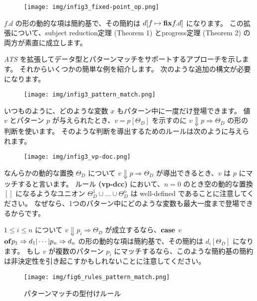 \documentclass[submit,techreq,noauthor,onecolumn]{ipsj}
\begin{document}
\begin{figure}[h]
\centering
\texttt{[image: img/infig3\_fixed-point\_op.png]}
\end{figure}

 $f.d$ の形の動的な項は簡約基で、その簡約は $d[f \mapsto {\bf fix} f.d]$ になります。
この拡張について、subject reduction定理 (Theorem 1) とprogress定理 (Theorem 2) の両方が素直に成立します。

{\it ATS} を拡張してデータ型とパターンマッチをサポートするアプローチを示します。
それからいくつかの簡単な例を紹介します。
次のような追加の構文が必要になります。

\begin{figure}[h]
\centering
\texttt{[image: img/infig3\_pattern\_match.png]}
\end{figure}

\noindent いつものように、どのような変数 $x$ もパターン中に一度だけ登場できます。
値 $v$ とパターン $p$ が与えられたとき、$v = p[\Theta_D]$ を示すのに $v \Downarrow p \Rightarrow \Theta_D$ の形の判断を使います。
そのような判断を導出するためのルールは次のように与えられます。

\begin{figure}[h]
\centering
\texttt{[image: img/infig3\_vp-doc.png]}
\end{figure}

\noindent なんらかの動的な置換 $\Theta_D$ について $v \Downarrow p \Rightarrow \Theta_D$ が導出できるとき、$v$ は $p$ にマッチすると言います。
ルール {\bf (vp-dcc)} において、$n = 0$ のとき空の動的な置換 $[]$ になるようなユニオン $\Theta^1_D \cup \ldots \cup \Theta^n_D$ は well-defined であることに注意してください。
なぜなら、1つのパターン中にどのような変数も最大一度まで登場できるからです。

$1 \leq i \leq n$ について $v \Downarrow p_i \Rightarrow \Theta_D$ が成立するなら、${\bf case}$ $v$ ${\bf of} p_1 \Rightarrow d_1 |\cdots| p_n \Rightarrow d_n$ の形の動的な項は簡約基で、その簡約は $d_i[\Theta_D]$ になります。
もし $v$ が複数のパターン $p_i$ にマッチするなら、このような簡約基の簡約は非決定性を引き起こすかもしれないことに注意してください。

\begin{figure}[h]
\centering
\texttt{[image: img/fig6\_rules\_pattern\_match.png]}
\caption{パターンマッチの型付けルール}
\label{fig:fig6_rules_pattern_match}
\end{figure}
\end{document}
